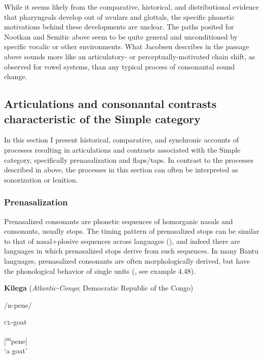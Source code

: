   While it seems likely from the comparative, historical, and distributional evidence that pharyngeals develop out of uvulars and glottals, the specific phonetic motivations behind these developments are unclear. The paths posited for Nootkan and Semitic above seem to be quite general and unconditioned by specific vocalic or other environments. What Jacobsen describes in the passage above sounds more like an articulatory- or perceptually-motivated chain shift, as observed for vowel systems, than any typical process of consonantal sound change.

\subsection{\rmfamily} 
\subsection{Articulations and consonantal contrasts characteristic of the Simple category}\label{sec:4.5.3}

  In this section I present historical, comparative, and synchronic accounts of processes resulting in articulations and contrasts associated with the Simple category, specifically prenasalization and flaps/taps. In contrast to the processes described in  above, the processes in this section can often be interpreted as sonorization or lenition.

\subsubsection{{Prenasalization} }\label{sec:4.5.3.1}

  Prenasalized consonants are phonetic sequences of homorganic nasals and consonants, usually stops. The timing pattern of prenasalized stops can be similar to that of nasal+plosive sequences across languages (\citealt{BrowmanGoldstein1986}), and indeed there are languages in which prenasalized stops derive from such sequences. In many Bantu languages, prenasalized consonants are often morphologically derived, but have the phonological behavior of single units (\citealt{Tak2011}, see example 4.48).

\ea\label{ex:4.48}
  \textbf{Kilega} (\textit{Atlantic-Congo}; Democratic Republic of the Congo)

/n-pene/

\textsc{cl}-goat

[\textsuperscript{m}pene]\\
\glt ‘a goat’
\citep[132]{Tak2011}
\z

